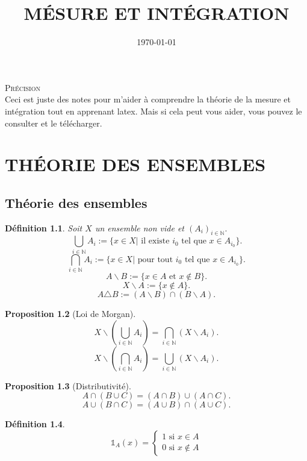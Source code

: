 \documentclass[a4paper,12pt,french]{report}
\title{MÉSURE ET INTÉGRATION}
\date{\today}
\author{}
\theoremstyle{break}
\newtheorem{defin}{Définition}[section]
\newtheorem{prop}[defin]{Proposition}
\begin{document}
\maketitle

\textsc{Précision} \\

Ceci est juste des notes pour m'aider à comprendre la théorie de la mesure et intégration tout en apprenant latex.
Mais si cela peut vous aider, vous pouvez le consulter et le télécharger.

\tableofcontents %


\chapter{THÉORIE DES ENSEMBLES}

\section{Théorie des ensembles}
\begin{defin}
Soit $X$ un ensemble non vide et $(A_{i})_{i \in \mathbb{N}}.$ 
      $$\bigcup_{i \in \mathbb{N}} A_{i} := \{ x \in X | \mbox{ il existe } i_{0} \mbox{ tel que } x \in A_{i_{0}}\}.$$
      $$\bigcap_{i \in \mathbb{N}} A_{i} := \{ x \in X | \mbox{ pour tout } i_{0} \mbox{ tel que } x \in A_{i_{0}}\}.$$
      $$A \backslash B := \{ x \in A \mbox{ et } x \not\in B\}.$$
      $$X\backslash A := \{ x \not\in A\}.$$
      $$ A \triangle B := (A \backslash  B) \cap (B \backslash A).$$ 
\end{defin}

\begin{prop}[Loi de Morgan]
     $$X\backslash \left(\bigcup_{i \in \mathbb{N}} A_{i}\right) = \bigcap_{i \in \mathbb{N}} (X \backslash A_{i}).$$
     $$X\backslash \left(\bigcap_{i \in \mathbb{N}} A_{i}\right) = \bigcup_{i \in \mathbb{N}} (X \backslash A_{i}).$$
\end{prop}

\begin{prop}[Distributivité]
     $$A \cap (B \cup C) = (A \cap B) \cup (A \cap C).$$
     $$A \cup (B \cap C) = (A \cup B) \cap (A \cup C).$$
\end{prop}

\begin{defin}
       $$\mathds{1}_{A}(x) = \left\{ \begin{array}{c} 1 \mbox{ si } x \in A \\ 0 \mbox{ si } x \not\in A\end{array}\right.$$
\end{defin}
\end{document}
